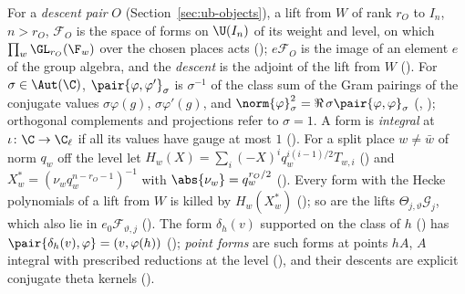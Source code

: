 For a \emph{descent pair} $O$ (Section~\ref{sec:ub-objects}), a lift from $W$ of rank $r_O$ to
$I_n$, $n>r_O$, $\mathcal F_O$ is the space of forms on $\U(I_n)$ of its weight and level, on which
$\prod_w\GL_{r_O}(\F_w)$ over the chosen places acts ();
$e\mathcal F_O$ is the image of an element $e$ of the group algebra, and the \emph{descent} is the
adjoint of the lift from $W$ (). For
$\sigma\in\Aut(\C)$, $\pair{\varphi,\varphi'}_\sigma$ is $\sigma^{-1}$ of the class sum of the Gram
pairings of the conjugate values $\sigma\varphi(g)$, $\sigma\varphi'(g)$, and
$\norm{\varphi}^2_\sigma=\Re\,\sigma\pair{\varphi,\varphi}_\sigma$
(, ); orthogonal
complements and projections refer to $\sigma=1$. A form is \emph{integral} at $\iota\colon\C\to\C_\ell$
if all its values have gauge at most $1$ (). For a
split place $w\ne\bar w$ of norm $q_w$ off the level let
$H_w(X)=\sum_i(-X)^iq_w^{i(i-1)/2}T_{w,i}$ () and
$X^*_w=(\nu_wq_w^{n-r_O-1})^{-1}$ with $\abs{\nu_w}=q_w^{r_O/2}$
(). Every form with the Hecke polynomials of a lift from $W$ is
killed by $H_w(X^*_w)$ (); so are the
lifts $\Theta_{j,\vartheta}\mathcal G_j$, which also lie in $e_0\mathcal F_{\vartheta,j}$
(). The form $\delta_h(v)$ supported on the class of $h$
() has $\pair{\delta_h(v),\varphi}=(v,\varphi(h))$
(); \emph{point forms} are such forms at points $hA$, $A$ integral
with prescribed reductions at the level (), and their descents are explicit
conjugate theta kernels ().

